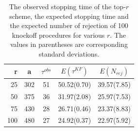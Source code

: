 \documentclass[]{interact}
\theoremstyle{plain}%
\theoremstyle{definition}
\theoremstyle{remark}
\begin{document}
\begin{table}[htbp]
  \centering
  \caption{The observed stopping time of the top-$r$ scheme, the expected stopping time and the expected number of rejection of 100 knockoff procedures for various $r$. The values in parentheses are corresponding standard deviations.}
    \begin{tabular}{rcccc}
    \toprule
    r& a & $\tau^{obs}$ & $E(\tau^{KF})$ & $E(N_{rej})$ \\
        \midrule
    25 & 302 & 51 & 50.52(0.70) & 39.57(7.85) \\
    50 & 375 & 36 & 31.97(2.08) & 25.97(7.53) \\
    75 & 430 & 28 & 26.71(0.46) & 23.37(8.83) \\
    100 & 480 & 27 & 24.92(0.37) & 22.97(5.92) \\
        \bottomrule
    \end{tabular}%
  \label{emp}%
\end{table}%
\end{document}
